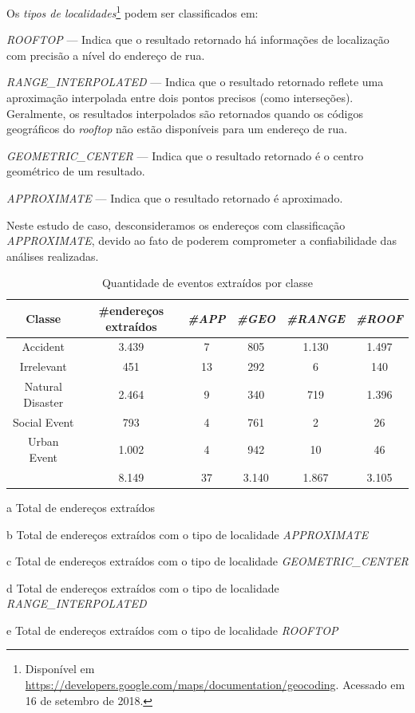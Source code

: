 \documentclass[
	12pt,				%
	oneside,			%
	a4paper,			%
	english,			%
	brazil				%
	]{abntex2ppgsi}
\begin{document}
Os \textit{tipos de localidades}\footnote{Disponível em \url{https://developers.google.com/maps/documentation/geocoding}. Acessado em 16 de setembro de 2018.} podem ser classificados em:
\begin{enumerate*}
\item \textit{ROOFTOP} --- Indica que o resultado retornado há informações de localização com precisão a nível do endereço de rua.
\item \textit{RANGE\_INTERPOLATED} --- Indica que o resultado retornado reflete uma aproximação interpolada entre dois pontos precisos (como interseções). Geralmente, os resultados interpolados são retornados quando os códigos geográficos do \textit{rooftop} não estão disponíveis para um endereço de rua.
\item \textit{GEOMETRIC\_CENTER} --- Indica que o resultado retornado é o centro geométrico de um resultado.
\item \textit{APPROXIMATE} --- Indica que o resultado retornado é aproximado.
\end{enumerate*}

Neste estudo de caso, desconsideramos os endereços com classificação \textit{APPROXIMATE}, devido ao fato de poderem comprometer a confiabilidade das análises realizadas. 

\begin{table}[!htb]
\centering
\caption {Quantidade de eventos extraídos por classe}
\label {tab:qtdExtractedAddresses}
\begin{threeparttable}
\begin{tabular}{c|c|c|c|c|c}
\toprule
\textbf{Classe} & \textbf{\#endereços extraídos\tnote{a}} & \textbf{\textit{\#APP\tnote{b}}} & \textbf{\textit{\#GEO\tnote{c}}} & \textbf{\textit{\#RANGE\tnote{d}}} & \textbf{\textit{\#ROOF\tnote{e}}} \\
\midrule
Accident & 3.439 & 7 & 805 & 1.130 & 1.497 \\
\hline
Irrelevant & 451 & 13 & 292 & 6 & 140 \\
\hline
Natural Disaster & 2.464 & 9 & 340 & 719 & 1.396 \\
\hline
Social Event & 793 & 4 & 761 & 2 & 26 \\
\hline
Urban Event & 1.002 & 4 & 942 & 10 & 46 \\
\midrule
{} & 8.149 & 37 & 3.140 & 1.867 & 3.105 \\
\bottomrule
\end{tabular}
\begin{tablenotes}
\item[a] Total de endereços extraídos
\item[b] Total de endereços extraídos com o tipo de localidade \textit{APPROXIMATE}
\item[c] Total de endereços extraídos com o tipo de localidade \textit{GEOMETRIC\_CENTER}
\item[d] Total de endereços extraídos com o tipo de localidade \textit{RANGE\_INTERPOLATED}
\item[e] Total de endereços extraídos com o tipo de localidade \textit{ROOFTOP}
\end{tablenotes}
\end{threeparttable}
\end{table}
\end{document}
